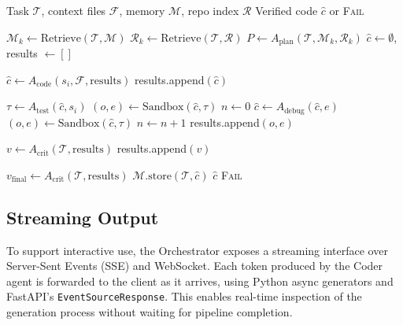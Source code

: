 \begin{algorithm}[t]
\caption{AgentForge Orchestration}
\label{alg:main}
\begin{algorithmic}[1]
\REQUIRE Task $\mathcal{T}$, context files $\mathcal{F}$,
         memory $\mathcal{M}$, repo index $\mathcal{R}$
\ENSURE  Verified code $\hat{c}$ or \textsc{Fail}

\STATE $\mathcal{M}_k \leftarrow \text{Retrieve}(\mathcal{T}, \mathcal{M})$
\STATE $\mathcal{R}_k \leftarrow \text{Retrieve}(\mathcal{T}, \mathcal{R})$
\STATE $P \leftarrow A_\text{plan}(\mathcal{T}, \mathcal{M}_k, \mathcal{R}_k)$
\STATE $\hat{c} \leftarrow \emptyset$,\; results $\leftarrow []$

    \STATE $\hat{c} \leftarrow A_\text{code}(s_i, \mathcal{F}, \text{results})$
    \STATE results.append$(\hat{c})$

    \STATE $\tau \leftarrow A_\text{test}(\hat{c}, s_i)$
    \STATE $(o, e) \leftarrow \text{Sandbox}(\hat{c}, \tau)$
    \STATE $n \leftarrow 0$
      \STATE $\hat{c} \leftarrow A_\text{debug}(\hat{c}, e)$
      \STATE $(o, e) \leftarrow \text{Sandbox}(\hat{c}, \tau)$
      \STATE $n \leftarrow n + 1$
    \ENDWHILE
    \STATE results.append$(o, e)$

    \STATE $v \leftarrow A_\text{crit}(\mathcal{T}, \text{results})$
    \STATE results.append$(v)$
  \ENDIF
\ENDFOR

\STATE $v_\text{final} \leftarrow A_\text{crit}(\mathcal{T}, \text{results})$
  \STATE $\mathcal{M}.\text{store}(\mathcal{T}, \hat{c})$
  \RETURN $\hat{c}$
\ELSE
  \RETURN \textsc{Fail}
\ENDIF
\end{algorithmic}
\end{algorithm}

\subsection{Streaming Output}
\label{sec:streaming}

To support interactive use, the Orchestrator exposes a
streaming interface over Server-Sent Events (SSE) and
WebSocket. Each token produced by the Coder agent is
forwarded to the client as it arrives, using Python
async generators and FastAPI's \texttt{EventSourceResponse}.
This enables real-time inspection of the generation process
without waiting for pipeline completion.

